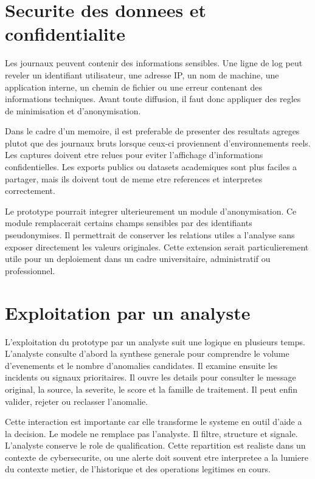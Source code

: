 \section{Securite des donnees et confidentialite}
Les journaux peuvent contenir des informations sensibles. Une ligne de log peut reveler un identifiant utilisateur, une adresse IP, un nom de machine, une application interne, un chemin de fichier ou une erreur contenant des informations techniques. Avant toute diffusion, il faut donc appliquer des regles de minimisation et d'anonymisation.

Dans le cadre d'un memoire, il est preferable de presenter des resultats agreges plutot que des journaux bruts lorsque ceux-ci proviennent d'environnements reels. Les captures doivent etre relues pour eviter l'affichage d'informations confidentielles. Les exports publics ou datasets academiques sont plus faciles a partager, mais ils doivent tout de meme etre references et interpretes correctement.

Le prototype pourrait integrer ulterieurement un module d'anonymisation. Ce module remplacerait certains champs sensibles par des identifiants pseudonymises. Il permettrait de conserver les relations utiles a l'analyse sans exposer directement les valeurs originales. Cette extension serait particulierement utile pour un deploiement dans un cadre universitaire, administratif ou professionnel.

\section{Exploitation par un analyste}
L'exploitation du prototype par un analyste suit une logique en plusieurs temps. L'analyste consulte d'abord la synthese generale pour comprendre le volume d'evenements et le nombre d'anomalies candidates. Il examine ensuite les incidents ou signaux prioritaires. Il ouvre les details pour consulter le message original, la source, la severite, le score et la famille de traitement. Il peut enfin valider, rejeter ou reclasser l'anomalie.

Cette interaction est importante car elle transforme le systeme en outil d'aide a la decision. Le modele ne remplace pas l'analyste. Il filtre, structure et signale. L'analyste conserve le role de qualification. Cette repartition est realiste dans un contexte de cybersecurite, ou une alerte doit souvent etre interpretee a la lumiere du contexte metier, de l'historique et des operations legitimes en cours.

